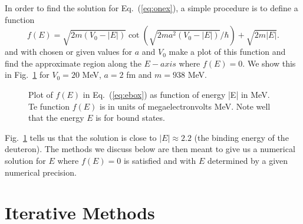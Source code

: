 In order to find the solution 
for Eq.\ (\ref{eq:onex}), a simple procedure is to define a function
\begin{equation}
   f(E)=\sqrt{2m(V_0-|E|)}\cot{(\sqrt{2ma^2(V_0-|E|)}/\hbar)}+\sqrt{2m|E|}. 
   \label{eq:ebox}
\end{equation}
and with chosen or given values for $a$ and $V_0$ make a plot of this function and find the 
approximate region along the $E-axis$ where 
$f(E)=0$. We show this in Fig.\ \ref{fig:chap8fig1} for $V_0=20$ MeV, $a=2$ fm and $m=938$ MeV.
\begin{figure}
%   
   \caption{Plot of $f(E)$ in Eq.\ (\ref{eq:ebox}) as function of energy |E| in MeV. Te function $f(E)$ is in units of megaelectronvolts MeV. Note well that the energy $E$ is for bound states.}
   \label{fig:chap8fig1}
\end{figure}
Fig.\ \ref{fig:chap8fig1} tells us that the solution is close to $|E|\approx 2.2$ (the binding
energy of the deuteron). The methods we discuss
below are then meant to give us a numerical solution for $E$ where $f(E)=0$ is
satisfied and with $E$ determined by a given numerical precision. 

\section{Iterative Methods}


